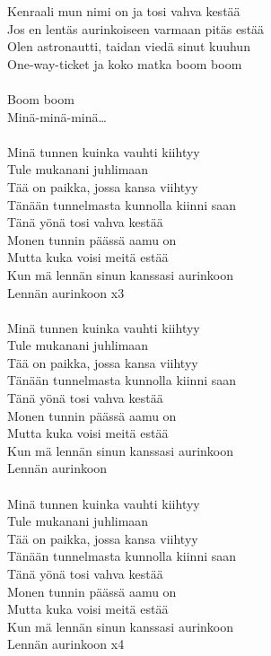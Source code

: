 Kenraali mun nimi on ja tosi vahva kestää \\
Jos en lentäs aurinkoiseen varmaan pitäs estää \\
Olen astronautti, taidan viedä sinut kuuhun \\
One-way-ticket ja koko matka boom boom \\
\hspace{10mm} \\
Boom boom \\
Minä-minä-minä… \\
\hspace{10mm} \\
Minä tunnen kuinka vauhti kiihtyy \\
Tule mukanani juhlimaan \\
Tää on paikka, jossa kansa viihtyy \\
Tänään tunnelmasta kunnolla kiinni saan \\
Tänä yönä tosi vahva kestää \\ 
Monen tunnin päässä aamu on \\
Mutta kuka voisi meitä estää \\
Kun mä lennän sinun kanssasi aurinkoon \\
Lennän aurinkoon x3 \\
\hspace{10mm} \\
Minä tunnen kuinka vauhti kiihtyy \\
Tule mukanani juhlimaan \\
Tää on paikka, jossa kansa viihtyy \\
Tänään tunnelmasta kunnolla kiinni saan \\
Tänä yönä tosi vahva kestää \\
Monen tunnin päässä aamu on \\
Mutta kuka voisi meitä estää \\
Kun mä lennän sinun kanssasi aurinkoon \\
Lennän aurinkoon \\
\hspace{10mm} \\
Minä tunnen kuinka vauhti kiihtyy \\
Tule mukanani juhlimaan \\
Tää on paikka, jossa kansa viihtyy \\
Tänään tunnelmasta kunnolla kiinni saan \\
Tänä yönä tosi vahva kestää \\
Monen tunnin päässä aamu on \\
Mutta kuka voisi meitä estää \\
Kun mä lennän sinun kanssasi aurinkoon \\
Lennän aurinkoon x4 \\

